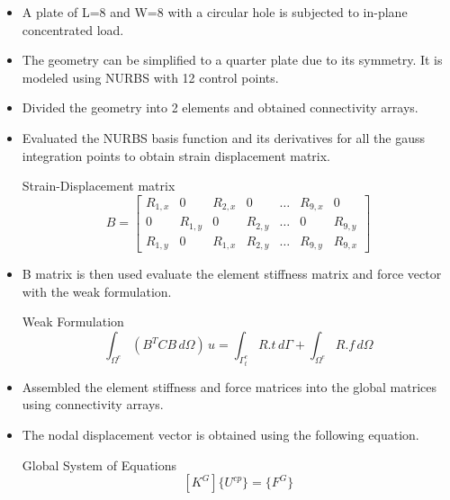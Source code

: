 \documentclass{beamer}
\begin{document}
\begin{frame}[allowframebreaks]
\begin{minipage}[b]{0.48\linewidth}
    \centering \label{Deformed Plate}
  \end{minipage}
\begin{itemize}
    \item A plate of L=8 and W=8 with a circular hole is subjected to in-plane concentrated load.

    \item The geometry can be simplified to a quarter plate due to its symmetry. It is modeled using NURBS with 12 control points.
\newpage
  
    \item Divided the geometry into 2 elements and obtained connectivity arrays.
    \item Evaluated the NURBS basis function and its derivatives for all the gauss integration points to obtain strain displacement matrix.
    \begin{block}{Strain-Displacement matrix}
    \begin{equation*}
        B=\begin{bmatrix}
        R_{1,x} & 0 & R_{2,x} & 0 & \dots & R_{9,x} & 0\\
        0 & R_{1,y} & 0 &R_{2,y} & \dots & 0 & R_{9,y}\\
        R_{1,y} & 0 &R_{1,x} &  R_{2,y} & \dots &  R_{9,y} &R_{9,x}
        \end{bmatrix}
    \end{equation*}
    \end{block}
    \item B matrix is then used evaluate the element stiffness matrix and force vector with the weak formulation.
    \begin{block}{Weak Formulation}
    \begin{equation*}
        \int_{\Omega^e} (B^TCB  \,d\Omega)\,u = \int_{\Gamma^e_t} R.t \,d\Gamma +\int_{\Omega^e} R.f \,d\Omega
    \end{equation*}
    \end{block}
    \item Assembled the element stiffness and force matrices into the global matrices using connectivity arrays.
    \item The nodal displacement vector is obtained using the following equation.
      \begin{block}{Global System of Equations}
      \begin{equation}\nonumber
          [K^G]\{U^{cp}\}=\{F^{G}\}
      \end{equation}
      \end{block}
      \newpage
  

\end{itemize}
\end{frame}
\end{document}
